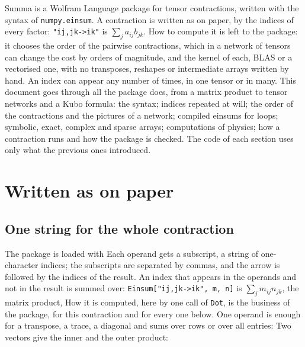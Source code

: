 \documentclass[11pt,a4paper]{article}
\begin{document}

\begin{tcolorbox}[colback=accentpale, colframe=accentpale, arc=2pt, left=8pt, right=8pt]
\small Summa is a Wolfram Language package for tensor contractions, written with the syntax of \texttt{numpy.einsum}. A
contraction is written as on paper, by the indices of every factor: \texttt{"ij,jk->ik"} is $\sum_ja_{ij}b_{jk}$. How to
compute it is left to the package: it chooses the order of the pairwise contractions, which in a network of tensors can
change the cost by orders of magnitude, and the kernel of each, BLAS or a vectorised one, with no transposes, reshapes or
intermediate arrays written by hand. An index can appear any number of times, in one tensor or in many. This document goes
through all the package does, from a matrix product to tensor networks and a Kubo formula: the syntax; indices repeated at
will; the order of the contractions and the pictures of a network; compiled einsums for loops; symbolic, exact, complex
and sparse arrays; computations of physics; how a contraction runs and how the package is checked. The code of each
section uses only what the previous ones introduced.
\end{tcolorbox}

{\small\tableofcontents}

\section{Written as on paper}

\subsection{One string for the whole contraction}
The package is loaded with
Each operand gets a subscript, a string of one-character indices; the subscripts are separated by commas, and the arrow is
followed by the indices of the result. An index that appears in the operands and not in the result is summed over:
\texttt{Einsum["ij,jk->ik", m, n]} is $\sum_jm_{ij}n_{jk}$, the matrix product,
How it is computed, here by one call of \texttt{Dot}, is the business of the package, for this contraction and for every
one below. One operand is enough for a transpose, a trace, a diagonal and sums over rows or over all entries:
Two vectors give the inner and the outer product:
\end{document}
